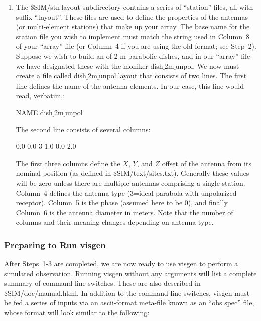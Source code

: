 \documentclass[12pt,psfig]{article}
\begin{document}
\begin{enumerate}
\item The {\sf \$SIM/stn$\underline~$layout} subdirectory
contains a series of ``station'' files, all with suffix
``.layout''. These files are used to define the properties of the antennas (or
multi-element stations) that make up your array. The base name for
the station file you wish to implement must match the string used in
Column~8 of your
``array'' file (or Column~4 if you are using the old format; see
Step~2). Suppose
we wish to build an  of 2-m parabolic dishes, and
in our ``array'' file we have designated these with the moniker {\sf
  dish$\underline~$2m$\underline~$unpol}. 
We now must create a file called {\sf
  dish$\underline~$2m$\underline~$unpol.layout} that consists of two
  lines. The first line defines the name of the antenna elements. In
  our case, this line would read, verbatim,:

\bigskip

\noindent NAME dish$\underline~$2m$\underline~$unpol

\bigskip

\noindent The second line consists of several columns:

\bigskip

 0.0 0.0 3 1.0 0.0 2.0

\bigskip

\noindent The first three
  columns define the
  $X$, $Y$, and $Z$ offset of the antenna from its nominal
  position (as defined in {\sf \$SIM/text/sites.txt}). 
   Generally these values will
  be zero unless there are multiple antennas comprising a single
  station. Column~4 defines the antenna type (3=ideal parabola with
  unpolarized receptor). Column~5 is the phase (assumed here to be 0), 
and finally Column~6
  is the antenna diameter in meters. Note that the number of columns
  and their meaning changes depending on  antenna type.  

 \end{enumerate}

\subsubsection{Preparing to Run {\sf visgen}\protect\label{visgen}}
After Steps~1-3 are completed, we are now ready to use
{\sf visgen} to perform a simulated observation. Running {\sf visgen}
without any arguments will list a complete summary of command line
switches. These are also described in {\sf \$SIM/doc/manual.html}.
In addition to the command line switches, {\sf visgen} must be fed a series
of inputs via an ascii-format meta-file known as an 
``obs spec'' file, whose format will look similar to
the following:
\end{document}
